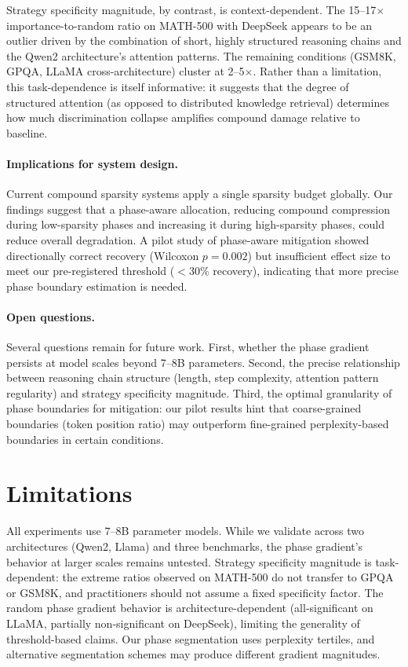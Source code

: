 \documentclass[11pt,a4paper]{article}
\begin{document}
Strategy specificity magnitude, by contrast, is context-dependent. The 15--17$\times$ importance-to-random ratio on MATH-500 with DeepSeek appears to be an outlier driven by the combination of short, highly structured reasoning chains and the Qwen2 architecture's attention patterns. The remaining conditions (GSM8K, GPQA, LLaMA cross-architecture) cluster at 2--5$\times$. Rather than a limitation, this task-dependence is itself informative: it suggests that the degree of structured attention (as opposed to distributed knowledge retrieval) determines how much discrimination collapse amplifies compound damage relative to baseline.

\paragraph{Implications for system design.}
Current compound sparsity systems apply a single sparsity budget globally. Our findings suggest that a phase-aware allocation, reducing compound compression during low-sparsity phases and increasing it during high-sparsity phases, could reduce overall degradation. A pilot study of phase-aware mitigation showed directionally correct recovery (Wilcoxon $p{=}0.002$) but insufficient effect size to meet our pre-registered threshold ($<30\%$ recovery), indicating that more precise phase boundary estimation is needed.

\paragraph{Open questions.}
Several questions remain for future work. First, whether the phase gradient persists at model scales beyond 7--8B parameters. Second, the precise relationship between reasoning chain structure (length, step complexity, attention pattern regularity) and strategy specificity magnitude. Third, the optimal granularity of phase boundaries for mitigation: our pilot results hint that coarse-grained boundaries (token position ratio) may outperform fine-grained perplexity-based boundaries in certain conditions.

\section{Limitations}

All experiments use 7--8B parameter models. While we validate across two architectures (Qwen2, Llama) and three benchmarks, the phase gradient's behavior at larger scales remains untested. Strategy specificity magnitude is task-dependent: the extreme ratios observed on MATH-500 do not transfer to GPQA or GSM8K, and practitioners should not assume a fixed specificity factor. The random phase gradient behavior is architecture-dependent (all-significant on LLaMA, partially non-significant on DeepSeek), limiting the generality of threshold-based claims. Our phase segmentation uses perplexity tertiles, and alternative segmentation schemes may produce different gradient magnitudes.
\end{document}

